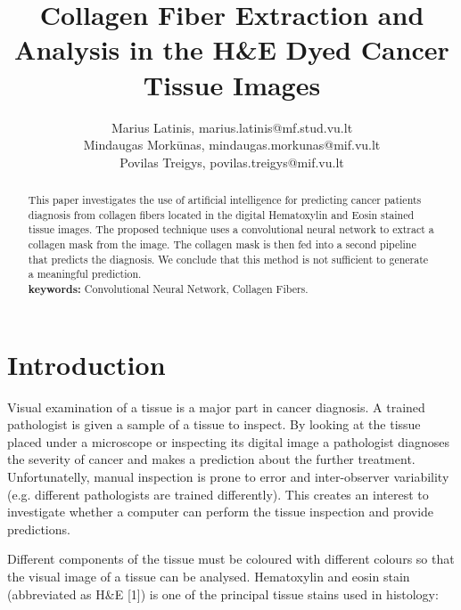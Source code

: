 \documentclass{article}
\begin{document}
\title{Collagen Fiber Extraction and Analysis in the H\&E Dyed Cancer Tissue Images}
\author{Marius Latinis, marius.latinis@mf.stud.vu.lt \\
        Mindaugas Mork\=unas, mindaugas.morkunas@mif.vu.lt \\
        Povilas Treigys, povilas.treigys@mif.vu.lt}


\maketitle

\begin{abstract}
    This paper investigates the use of artificial intelligence for
    predicting cancer patients diagnosis from collagen fibers located in the digital
    Hematoxylin and Eosin stained tissue images. The proposed technique uses a convolutional
    neural network to extract a collagen mask from the image. The collagen mask is then fed
    into a second pipeline that predicts the diagnosis. We conclude that this method is
    not sufficient to generate a meaningful prediction. \\

    \textbf{keywords:} Convolutional Neural Network, Collagen Fibers.
\end{abstract}


\section{Introduction}

Visual examination of a tissue is a major part in cancer diagnosis. A
trained pathologist is given a sample of a tissue to inspect. By looking at the tissue placed
under a microscope or inspecting its digital image a pathologist diagnoses the severity of
cancer and makes a prediction about the further treatment. Unfortunatelly, manual inspection is
prone to error and inter-observer variability (e.g. different pathologists are trained
differently). This creates an interest to investigate whether a computer can perform the
tissue inspection and provide predictions.

Different components of the tissue must be coloured with different colours
so that the visual image of a tissue can be analysed. Hematoxylin and eosin
stain (abbreviated as H\&E [1]) is one of the principal tissue stains used
in histology: \\
\end{document}
